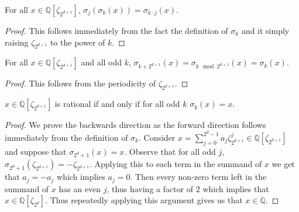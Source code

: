 \documentclass[12pt]{dalthesis}
\begin{document}
\begin{proposition}
For all $x \in \mathbb{Q}[\zeta_{2^{d+1}}]$, $\sigma_j(\sigma_k (x)) = \sigma_{k\cdot j}(x)$.
\end{proposition}
\begin{proof}
This follows immediately from the fact the definition of $\sigma_k$ and it simply raising $\zeta_{2^{d+1}}$ to the power of $k$.
\end{proof}

\begin{proposition}
\label{sigmaperiod}
For all $x \in \mathbb{Q}[\zeta_{2^{d+1}}]$ and all odd $k$, $\sigma_{k+2^{d+1}}(x) = \sigma_{k \mod 2^{d+1}}(x) = \sigma_k (x)$.
\end{proposition}
\begin{proof}
This follows from the periodicity of $\zeta_{2^{d+1}}$.
\end{proof}

\begin{proposition}
\label{sigmaration}
$x \in \mathbb{Q}[\zeta_{2^{d+1}}]$ is rational if and only if for all odd $k$ $\sigma_k(x) = x$.
\end{proposition}
\begin{proof}
We prove the backwards direction as the forward direction follows immediately from the definition of $\sigma_k$. Consider $x = \sum\limits_{j=0}^{2^d-1} a_j \zeta_{2^{d+1}}^j \in \mathbb{Q}[\zeta_{2^{d+1}}]$ and suppose that $\sigma_{2^d+1} (x) = x$. Observe that for all odd $j$, $\sigma_{2^d+1} (\zeta_{2^{d+1}}) = -\zeta_{2^{d+1}}$. Applying this to each term in the summand of $x$ we get that $a_j = - a_j$ which implies $a_j = 0$. Then every non-zero term left in the summand of $x$ has an even $j$, thus having a factor of $2$ which implies that $x \in \mathbb{Q}[\zeta_{2^{d}}]$. Thus repeatedly applying this argument gives us that $x \in \mathbb{Q}$.
\end{proof}
\end{document}
